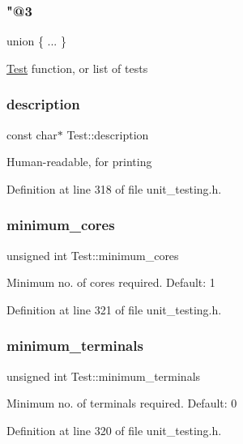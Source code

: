 \subsubsection{\texorpdfstring{"@3}{@3}}
{\footnotesize\ttfamily union \{ ... \} }

\hyperlink{structTest}{Test} function, or list of tests \mbox{\label{structTest_a294ca3f1114240c908f66216afcad783}} 
\subsubsection{\texorpdfstring{description}{description}}
{\footnotesize\ttfamily const char$\ast$ Test\+::description}

Human-\/readable, for printing 

Definition at line 318 of file unit\+\_\+testing.\+h.

\mbox{\label{structTest_ac203918837b4c6718a020246e189a95a}} 
\subsubsection{\texorpdfstring{minimum\+\_\+cores}{minimum\_cores}}
{\footnotesize\ttfamily unsigned int Test\+::minimum\+\_\+cores}

Minimum no. of cores required. Default\+: 1 

Definition at line 321 of file unit\+\_\+testing.\+h.

\mbox{\label{structTest_a2741188633c51b8e3cb545fa3971bf60}} 
\subsubsection{\texorpdfstring{minimum\+\_\+terminals}{minimum\_terminals}}
{\footnotesize\ttfamily unsigned int Test\+::minimum\+\_\+terminals}

Minimum no. of terminals required. Default\+: 0 

Definition at line 320 of file unit\+\_\+testing.\+h.

\mbox{\label{structTest_ae44674e48b203d9c26e04e09b6fe5b61}} 
